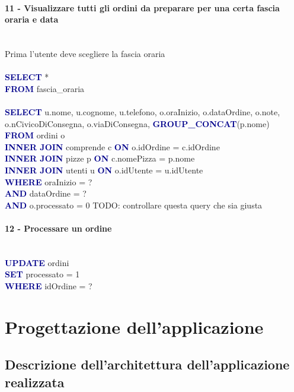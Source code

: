 \documentclass[a4paper,12pt, oneside]{article}
\begin{document}
\paragraph{11 - Visualizzare tutti gli ordini da preparare per una certa fascia oraria e data}
\hphantom{A}\\    %
Prima l'utente deve scegliere la fascia oraria
\\\\
\textcolor{darkBlue}{\textbf{SELECT}} *
\\\textcolor{darkBlue}{\textbf{FROM}} fascia\_oraria
\\\\
\textcolor{darkBlue}{\textbf{SELECT}} u.nome, u.cognome, u.telefono, o.oraInizio, o.dataOrdine, o.note, o.nCivicoDiConsegna, o.viaDiConsegna, \textcolor{darkBlue}{\textbf{GROUP\_CONCAT}}(p.nome)
\\\textcolor{darkBlue}{\textbf{FROM}} ordini o
\\\textcolor{darkBlue}{\textbf{INNER JOIN}} comprende c \textcolor{darkBlue}{\textbf{ON}} o.idOrdine = c.idOrdine
\\\textcolor{darkBlue}{\textbf{INNER JOIN}} pizze p \textcolor{darkBlue}{\textbf{ON}} c.nomePizza = p.nome
\\\textcolor{darkBlue}{\textbf{INNER JOIN}} utenti u \textcolor{darkBlue}{\textbf{ON}} o.idUtente = u.idUtente
\\\textcolor{darkBlue}{\textbf{WHERE}} oraInizio = ?
\\\textcolor{darkBlue}{\textbf{AND}} dataOrdine = ?
\\\textcolor{darkBlue}{\textbf{AND}} o.processato = 0
TODO: controllare questa query che sia giusta

\paragraph{12 - Processare un ordine}
\hphantom{A}\\    %
\textcolor{darkBlue}{\textbf{UPDATE}} ordini
\\\textcolor{darkBlue}{\textbf{SET}} processato = 1
\\\textcolor{darkBlue}{\textbf{WHERE}} idOrdine = ?

\newpage
\section{Progettazione dell'applicazione}
\subsection{Descrizione dell'architettura dell'applicazione realizzata}
\end{document}
